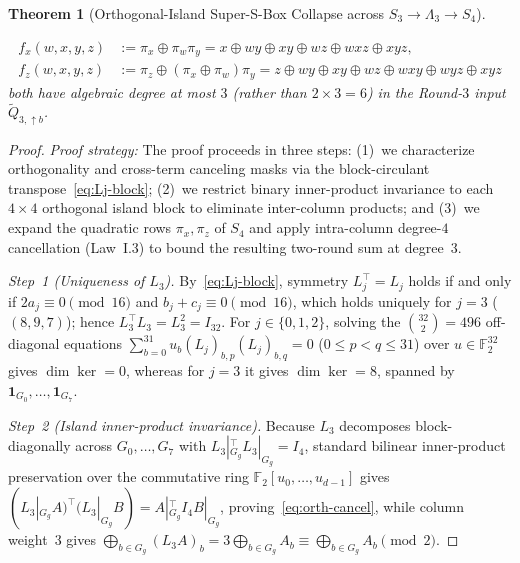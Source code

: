 \documentclass[11pt,a4paper]{article}
\newtheorem{theorem}{Theorem}
\theoremstyle{definition}
\theoremstyle{remark}
\newcommand{\Ftwo}{\mathbb{F}_2}
\begin{document}
\begin{theorem}[Orthogonal-Island Super-S-Box Collapse across $S_3 \to \Lambda_3 \to S_4$]
\begin{enumerate}[leftmargin=1.8em]
    \[
    \begin{aligned}
    f_x(w,x,y,z) &:= \pi_x \oplus \pi_w \pi_y = x \oplus wy \oplus xy \oplus wz \oplus wxz \oplus xyz, \\
    f_z(w,x,y,z) &:= \pi_z \oplus (\pi_x \oplus \pi_w)\pi_y = z \oplus wy \oplus xy \oplus wz \oplus wxy \oplus wyz \oplus xyz
    \end{aligned}
    \]
    both have algebraic degree \emph{at most $3$} (rather than $2 \times 3 = 6$) in the Round-$3$ input $\tilde{Q}_{3,\uparrow b}$.
\end{enumerate}
\end{theorem}

\begin{proof}
\emph{Proof strategy:} The proof proceeds in three steps: (1)~we characterize orthogonality and cross-term canceling masks via the block-circulant transpose~\eqref{eq:Lj-block}; (2)~we restrict binary inner-product invariance to each $4 \times 4$ orthogonal island block to eliminate inter-column products; and (3)~we expand the quadratic rows $\pi_x, \pi_z$ of $S_4$ and apply intra-column degree-$4$ cancellation (Law~I.3) to bound the resulting two-round sum at degree~$3$.

\emph{Step~1 (Uniqueness of $L_3$).} By~\eqref{eq:Lj-block}, symmetry $L_j^\top = L_j$ holds if and only if $2a_j \equiv 0 \pmod{16}$ and $b_j + c_j \equiv 0 \pmod{16}$, which holds uniquely for $j = 3$ ($(8, 9, 7)$); hence $L_3^\top L_3 = L_3^2 = I_{32}$. For $j \in \{0, 1, 2\}$, solving the $\binom{32}{2} = 496$ off-diagonal equations $\sum_{b=0}^{31} u_b (L_j)_{b,p}(L_j)_{b,q} = 0$ ($0 \le p < q \le 31$) over $u \in \Ftwo^{32}$ gives $\dim \ker = 0$, whereas for $j = 3$ it gives $\dim \ker = 8$, spanned by $\mathbf{1}_{G_0}, \dots, \mathbf{1}_{G_7}$.

\emph{Step~2 (Island inner-product invariance).} Because $L_3$ decomposes block-diagonally across $G_0, \dots, G_7$ with $L_3|_{G_g}^\top L_3|_{G_g} = I_4$, standard bilinear inner-product preservation over the commutative ring $\Ftwo[u_0,\dots,u_{d-1}]$ gives $(L_3|_{G_g} A)^\top (L_3|_{G_g} B) = A|_{G_g}^\top I_4 B|_{G_g}$, proving~\eqref{eq:orth-cancel}, while column weight~$3$ gives $\bigoplus_{b \in G_g} (L_3 A)_b = 3 \bigoplus_{b \in G_g} A_b \equiv \bigoplus_{b \in G_g} A_b \pmod 2$.


\end{proof}
\end{document}
